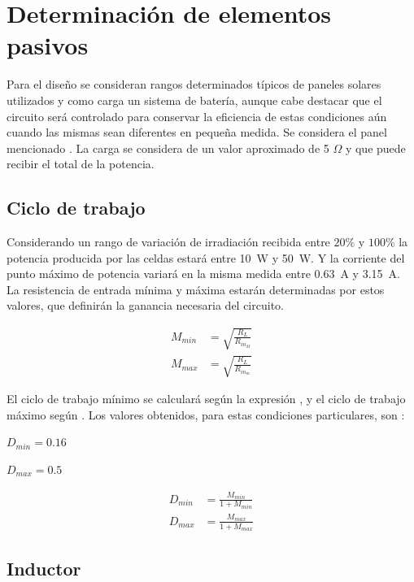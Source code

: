     \section{Determinación de elementos pasivos}
    
    Para el diseño se consideran rangos determinados típicos de paneles solares utilizados y como carga un sistema de batería, aunque cabe destacar que el circuito será controlado para conservar la eficiencia de estas condiciones aún cuando las mismas sean diferentes en pequeña medida. Se considera el panel mencionado \cite{PV_datasheet}. La carga se considera de un valor aproximado de 5 $\Omega$ y que puede recibir el total de la potencia. 
    
        \subsection{Ciclo de trabajo}
        
         Considerando un rango de variación de irradiación recibida entre $20\%$ y $100\%$  la potencia producida por las celdas estará entre 10~W y 50~W. Y la corriente del punto máximo de potencia variará en la misma medida entre 0.63~A y 3.15~A. La resistencia de entrada mínima y máxima estarán determinadas por estos valores, que definirán la ganancia necesaria del circuito. 
 
            \begin{align}
                M_{min} &= \sqrt{\frac{R_L}{R_{in_{M}}}} \\
                M_{max} &= \sqrt{\frac{R_L}{R_{in_{m}}}}
            \end{align}
       
        El ciclo de trabajo mínimo se calculará según la expresión , y el ciclo de trabajo máximo según . Los valores obtenidos, para estas condiciones particulares, son : 
        
            $D_{min} = 0.16$
            
            $D_{max} = 0.5$
        
        
            \begin{align}
                D_{min} &= \frac{M_{min}}{ 1 + M_{min}} \label{ec: D minimo} \\
                D_{max} &= \frac{M_{max}}{ 1 + M_{max}} \label{ec: D maximo}
            \end{align}
      
  
        \subsection{Inductor}
        
